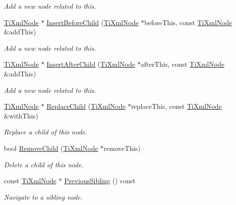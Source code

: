 \begin{DoxyCompactItemize}
\begin{DoxyCompactList}\small\item\em Add a new node related to this. \item\end{DoxyCompactList}\item 
\hyperlink{classTiXmlNode}{TiXmlNode} $\ast$ \hyperlink{classTiXmlNode_a71e54e393336382bc9875f64aab5cb15}{InsertBeforeChild} (\hyperlink{classTiXmlNode}{TiXmlNode} $\ast$beforeThis, const \hyperlink{classTiXmlNode}{TiXmlNode} \&addThis)
\begin{DoxyCompactList}\small\item\em Add a new node related to this. \item\end{DoxyCompactList}\item 
\hyperlink{classTiXmlNode}{TiXmlNode} $\ast$ \hyperlink{classTiXmlNode_a274db3292218202805c093f66a964cb5}{InsertAfterChild} (\hyperlink{classTiXmlNode}{TiXmlNode} $\ast$afterThis, const \hyperlink{classTiXmlNode}{TiXmlNode} \&addThis)
\begin{DoxyCompactList}\small\item\em Add a new node related to this. \item\end{DoxyCompactList}\item 
\hyperlink{classTiXmlNode}{TiXmlNode} $\ast$ \hyperlink{classTiXmlNode_a543208c2c801c84a213529541e904b9f}{ReplaceChild} (\hyperlink{classTiXmlNode}{TiXmlNode} $\ast$replaceThis, const \hyperlink{classTiXmlNode}{TiXmlNode} \&withThis)
\begin{DoxyCompactList}\small\item\em Replace a child of this node. \item\end{DoxyCompactList}\item 
bool \hyperlink{classTiXmlNode_ae19d8510efc90596552f4feeac9a8fbf}{RemoveChild} (\hyperlink{classTiXmlNode}{TiXmlNode} $\ast$removeThis)
\begin{DoxyCompactList}\small\item\em Delete a child of this node. \item\end{DoxyCompactList}\item 
const \hyperlink{classTiXmlNode}{TiXmlNode} $\ast$ \hyperlink{classTiXmlNode_ac2cd892768726270e511b2ab32de4d10}{PreviousSibling} () const 
\begin{DoxyCompactList}\small\item\em Navigate to a sibling node. \item\end{DoxyCompactList}\item 

\end{DoxyCompactItemize}
